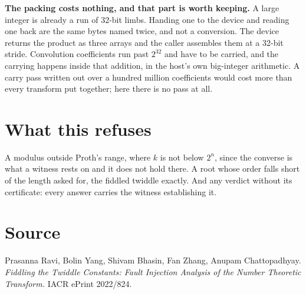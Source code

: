 \textbf{The packing costs nothing, and that part is worth keeping.} A large integer is already a run of 32-bit limbs. Handing one to the device and reading one back are the same bytes named twice, and not a conversion. The device returns the product as three arrays and the caller assembles them at a 32-bit stride. Convolution coefficients run past \(2^{32}\) and have to be carried, and the carrying happens inside that addition, in the host's own big-integer arithmetic. A carry pass written out over a hundred million coefficients would cost more than every transform put together; here there is no pass at all.

\section{What this refuses}

A modulus outside Proth's range, where \(k\) is not below \(2^n\), since the converse is what a witness rests on and it does not hold there. A root whose order falls short of the length asked for, the fiddled twiddle exactly. And any verdict without its certificate: every answer carries the witness establishing it.

\section{Source}

Prasanna Ravi, Bolin Yang, Shivam Bhasin, Fan Zhang, Anupam Chattopadhyay. \emph{Fiddling the Twiddle Constants: Fault Injection Analysis of the Number Theoretic Transform.} IACR ePrint 2022/824.
